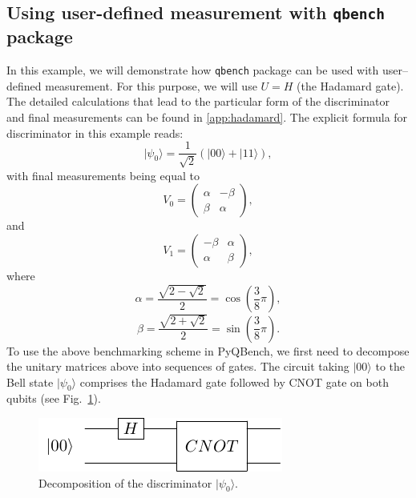 \documentclass[preprint,12pt, a4paper, dvipsnames]{elsarticle}
\newcommand{\ket}[1]{\ensuremath{|#1\rangle}}
\newcommand{\1}{{\rm 1\hspace{-0.9mm}l}}
\theoremstyle{definition}
\begin{document}
\subsection{Using user-defined measurement with \texttt{qbench} package}
In this example, we will demonstrate how \texttt{qbench} package can be used with user--defined
measurement. For this purpose, we will use $U = H$ (the Hadamard gate). The detailed calculations
that lead to the particular form of the discriminator and final measurements can be found in
\ref{app:hadamard}.
\noindent
The explicit formula for discriminator in this example reads:
\begin{equation}
\ket{\psi_0} = \frac{1}{\sqrt{2}} (\ket{00} + \ket{11}),
\end{equation}
with final measurements being equal to
\begin{equation}
V_0 =
\left(\begin{array}{cc} \alpha & -\beta\\ \beta & \alpha \end{array}\right),
\end{equation}
and \begin{equation}
V_1 =
\left(\begin{array}{cc} -\beta & \alpha \\ \alpha & \beta \end{array}\right),
\end{equation}
where \begin{equation}
\alpha = \frac{\sqrt{2 - \sqrt{2}}}{2} = \cos\left( \frac{3}{8} \pi \right),
\end{equation}
\begin{equation}
\beta  = \frac{\sqrt{2  + \sqrt{2}}}{2} = \sin\left( \frac{3}{8} \pi \right).
\end{equation}
To use the above benchmarking scheme in PyQBench, we first need to decompose the unitary matrices
above into sequences of gates.
The circuit taking $\ket{00}$ to the Bell state $\ket{\psi_0}$  comprises the Hadamard gate followed by CNOT gate on both qubits (see Fig.~\ref{fig:discriminator}).
\begin{figure}[h!]
	\centering
	\includegraphics[scale=1.7]{pics/discriminator}
	\caption{Decomposition of the discriminator $\ket{\psi_0}$. }
	\label{fig:discriminator}
\end{figure}
\end{document}
